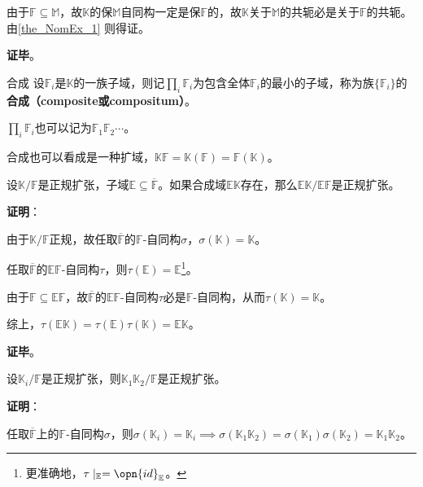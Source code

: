 
由于$\mathbb{F}\subseteq\mathbb{M}$，故$\mathbb{K}$的保$\mathbb{M}$自同构一定是保$\mathbb{F}$的，故$\mathbb{K}$关于$\mathbb{M}$的共轭必是关于$\mathbb{F}$的共轭。由\autoref{the_NomEx_1} 则得证。

\textbf{证毕}。





\begin{definition}{合成}
设$\mathbb{F}_i$是$\mathbb{K}$的一族子域，则记$\prod_{i}\mathbb{F}_i$为包含全体$\mathbb{F}_i$的最小的子域，称为族$\{\mathbb{F}_i\}$的\textbf{合成（composite或compositum）}。

$\prod_{i}\mathbb{F}_i$也可以记为$\mathbb{F}_1\mathbb{F}_2\cdots$。
\end{definition}


合成也可以看成是一种扩域，$\mathbb{K}\mathbb{F}=\mathbb{K}(\mathbb{F})=\mathbb{F}(\mathbb{K})$。


\begin{theorem}{}\label{the_NomEx_7}
设$\mathbb{K}/\mathbb{F}$是正规扩张，子域$\mathbb{E}\subseteq\overline{\mathbb{F}}$。如果合成域$\mathbb{EK}$存在，那么$\mathbb{EK}/\mathbb{EF}$是正规扩张。
\end{theorem}

\textbf{证明}：


由于$\mathbb{K}/\mathbb{F}$正规，故任取$\overline{\mathbb{F}}$的$\mathbb{F}$-自同构$\sigma$，$\sigma(\mathbb{K})=\mathbb{K}$。

任取$\overline{\mathbb{F}}$的$\mathbb{EF}$-自同构$\tau$，则$\tau(\mathbb{E})=\mathbb{E}$\footnote{更准确地，$\tau\mid_{\mathbb{E}}=\opn{id}_\mathbb{E}$。}。

由于$\mathbb{F}\subseteq\mathbb{EF}$，故$\overline{\mathbb{F}}$的$\mathbb{EF}$-自同构$\tau$必是$\mathbb{F}$-自同构，从而$\tau(\mathbb{K})=\mathbb{K}$。

综上，$\tau(\mathbb{EK})=\tau(\mathbb{E})\tau(\mathbb{K})=\mathbb{EK}$。

\textbf{证毕}。






\begin{theorem}{}
设$\mathbb{K}_i/\mathbb{F}$是正规扩张，则$\mathbb{K}_1\mathbb{K}_2/\mathbb{F}$是正规扩张。
\end{theorem}


\textbf{证明}：

任取$\overline{\mathbb{F}}$上的$\mathbb{F}$-自同构$\sigma$，则$\sigma(\mathbb{K}_i)=\mathbb{K}_i\implies \sigma(\mathbb{K}_1\mathbb{K}_2)=\sigma(\mathbb{K}_1)\sigma(\mathbb{K}_2)=\mathbb{K}_1\mathbb{K}_2$。

